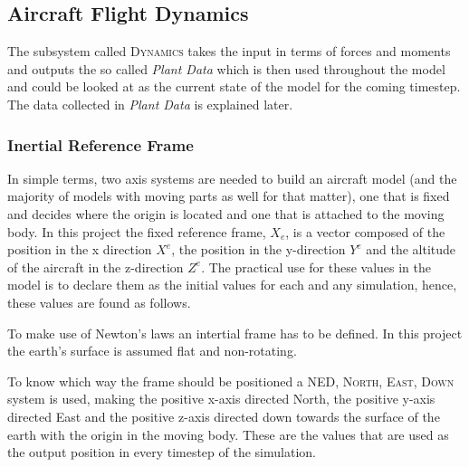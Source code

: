 \subsection{Aircraft Flight Dynamics}


The subsystem called \textsc{Dynamics} takes the input in terms of forces and moments and outputs the so called \textit{Plant Data} which is then used throughout the model and could be looked at as the current state of the model for the coming timestep. The data collected in \textit{Plant Data} is explained later.

\subsubsection{Inertial Reference Frame}

In simple terms, two axis systems are needed to build an aircraft model (and the majority of models with moving parts as well for that matter), one that is fixed and decides where the origin is located and one that is attached to the moving body. In this project the fixed reference frame, \textbf{$X_e$}, is a vector composed of the position in the x direction $X^e$, the position in the y-direction $Y^e$ and the altitude of the aircraft in the z-direction $Z^e$. The practical use for these values in the model is to declare them as the initial values for each and any simulation, hence, these values are found as follows.



%
%
To make use of Newton's laws an intertial frame has to be defined. In this project the earth's surface is assumed flat and non-rotating.
%

To know which way the frame should be positioned a \textsc{NED, North, East, Down} system is used, making the positive x-axis directed North, the positive y-axis directed East and the positive z-axis directed down towards the surface of the earth with the origin in the moving body. These are the values that are used as the output position in every timestep of the simulation.

